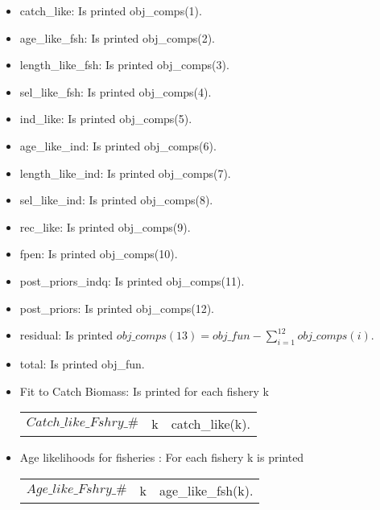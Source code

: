 \documentclass{article}
\begin{document}
\begin{itemize}
    \item  catch\_like: Is printed obj\_comps(1).
    \item age\_like\_fsh: Is printed obj\_comps(2).
    \item length\_like\_fsh: Is printed obj\_comps(3).
    \item sel\_like\_fsh: Is printed obj\_comps(4).
    \item ind\_like: Is printed obj\_comps(5).
    \item age\_like\_ind: Is printed obj\_comps(6).
    \item length\_like\_ind: Is printed obj\_comps(7).
    \item sel\_like\_ind: Is printed obj\_comps(8).
    \item rec\_like: Is printed obj\_comps(9).
    \item fpen: Is printed obj\_comps(10).
    \item post\_priors\_indq: Is printed obj\_comps(11).
    \item post\_priors: Is printed obj\_comps(12).
    \item residual: Is printed $obj\_comps(13)= obj\_fun - \displaystyle\sum_{i=1}^{12}obj\_comps(i)$.
    \item total: Is printed obj\_fun.
    \item Fit to Catch Biomass: Is printed for each fishery k 
    \begin{center}
        \begin{tabular}{c c c}
            $Catch\_like\_Fshry\_\#$ &  k & catch\_like(k).\\
        \end{tabular}
    \end{center}
    \item Age likelihoods for fisheries : For each fishery k is printed
    \begin{center}
        \begin{tabular}{c c c}
            $Age\_like\_Fshry\_\#$ & k & age\_like\_fsh(k). \\
            

\end{tabular}
\end{center}
\end{itemize}
\end{document}

